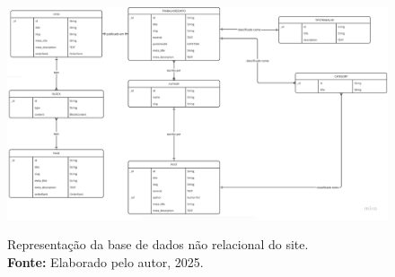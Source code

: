     \begin{figure}[H]
        \centering
        \includegraphics[height=7cm, keepaspectratio]{img/sanity/diagrama banco de dados.png}
        \caption{ Representação da base de dados não relacional do site.\\
            \textbf{Fonte:} Elaborado pelo autor, 2025.}
        \label{fig:diagrama sanity}
    \end{figure}

